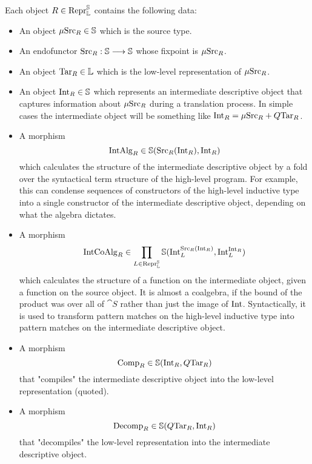 Each object $R \in \mathrm{Repr} _{\mathbb L} ^{\mathbb S}$ contains the following data:
\begin{itemize}
  \item An object $\mathrm \mu \mathrm {Src} _R \in \mathbb S$ which is the source type.
  \item An endofunctor $\mathrm {Src} _R : \mathbb S \longrightarrow \mathbb S$ whose fixpoint is $\mu
          \mathrm {Src} _R$.
  \item An object $\mathrm {Tar} _R \in \mathbb L$ which is the low-level representation of
        $\mu \mathrm {Src} _R$.
  \item An object $\mathrm {Int}_R \in \mathbb S$ which represents an intermediate
        descriptive object that captures information about $\mu \mathrm {Src} _R$ during a
        translation process. In simple cases the intermediate object will be something
        like $\mathrm {Int}_R = \mu \mathrm {Src} _R + Q \mathrm {Tar}_R$.
  \item A morphism $$\mathrm {IntAlg} _R \in \mathbb S (\mathrm {Src}_R (\mathrm {Int}_R), \mathrm
          {Int}_R)$$ which calculates the structure of the intermediate descriptive
        object by a fold over the syntactical term structure of the high-level program.
        For example, this can condense sequences of constructors of the high-level
        inductive type into a single constructor of the intermediate descriptive
        object, depending on what the algebra dictates.
  \item A morphism $$\mathrm {IntCoAlg} _R \in \prod _{L \in \mathrm{Repr} _{\mathbb L} ^{\mathbb S}}
          \mathbb S ( \mathrm {Int}_L ^{\mathrm {Src}_R (\mathrm {Int}_R)}, \mathrm {Int}_L ^{\mathrm
          {Int}_R})$$ which calculates the structure of a function on the intermediate
        object, given a function on the source object. It is almost a coalgebra, if the
        bound of the product was over all of $\cat S$ rather than just the image of
        $\mathrm {Int}$. Syntactically, it is used to transform pattern matches on the
        high-level inductive type into pattern matches on the intermediate descriptive
        object.
  \item A morphism $$\mathrm {Comp} _R \in \mathbb S (\mathrm {Int}_R , Q \mathrm {Tar}_R)$$ that
        "compiles" the intermediate descriptive object into the low-level
        representation (quoted).
  \item A morphism $$\mathrm {Decomp} _R \in \mathbb S (Q \mathrm {Tar}_R, \mathrm {Int}_R)$$ that
        "decompiles" the low-level representation into the intermediate descriptive
        object.
\end{itemize}


